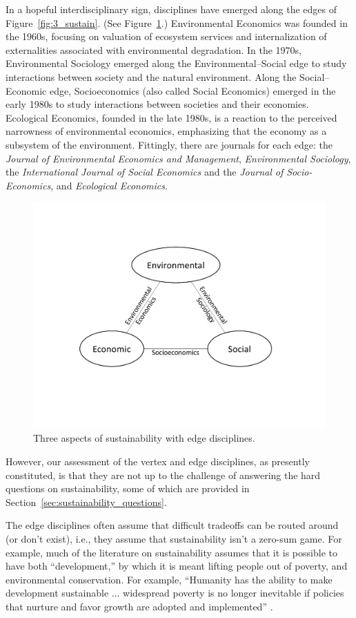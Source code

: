 \documentclass[12pt]{article}
\begin{document}
In a hopeful interdisciplinary sign, 
disciplines have emerged along the edges of Figure~\ref{fig:3_sustain}.
(See Figure~\ref{fig:3_sustain_with_edge_disciplines}.)
Environmental Economics was founded in the 1960s,
focusing on valuation of ecosystem services and 
internalization of externalities associated with environmental degradation.
In the 1970s, Environmental Sociology emerged along the Environmental--Social edge 
to study interactions between society and the natural environment. 
Along the Social--Economic edge, Socioeconomics (also called Social Economics) 
emerged in the early 1980s
to study interactions between societies and their economies.
Ecological Economics, founded in the late 1980s, 
is a reaction to the perceived narrowness of environmental economics, 
emphasizing that the economy as a subsystem of the environment.
Fittingly, there are journals for each edge:
the \emph{Journal of Environmental Economics and Management}, 
\emph{Environmental Sociology}, 
the \emph{International Journal of Social Economics} and the \emph{Journal of Socio-Economics}, and
\emph{Ecological Economics}.

\begin{figure}
\centering
\includegraphics[width=0.75\linewidth]{figure_other/TriangleDiagramWithDisciplines.pdf}
\caption{Three aspects of sustainability with edge disciplines.}
\label{fig:3_sustain_with_edge_disciplines}
\end{figure}

However, our assessment of the vertex and edge disciplines,
as presently constituted,
is that they are not up to the challenge of answering the hard questions on sustainability,
some of which are provided in Section~\ref{sec:sustainability_questions}.

The edge disciplines often assume that difficult tradeoffs can be routed around (or don't exist), 
i.e., they assume that sustainability isn't a zero-sum game. 
For example, 
much of the literature on sustainability 
assumes that it is possible to have both ``development,'' 
by which it is meant lifting people out of poverty,
and environmental conservation. 
For example, ``Humanity has the ability to make development sustainable ... widespread poverty is no
longer inevitable if policies that nurture and favor growth are adopted and implemented'' \cite{Ngome2015}.
\end{document}
